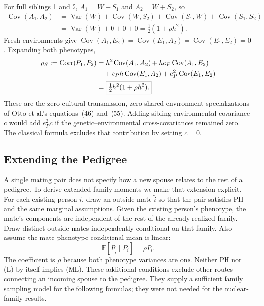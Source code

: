 For full siblings 1 and 2, $A_1=W+S_1$ and $A_2=W+S_2$, so
\begin{align*}
 \operatorname{Cov}(A_1,A_2)
 &=\operatorname{Var}(W)+\operatorname{Cov}(W,S_2)
   +\operatorname{Cov}(S_1,W)+\operatorname{Cov}(S_1,S_2)\\
 &=\operatorname{Var}(W)+0+0+0
   =\tfrac12(1+\rho h^2).
\end{align*}
Fresh environments give
$\operatorname{Cov}(A_1,E_2)=\operatorname{Cov}(E_1,A_2)
=\operatorname{Cov}(E_1,E_2)=0$. Expanding both phenotypes,
\begin{align}
 \rho_S:=\operatorname{Corr}(P_1,P_2)
 &=h^2\operatorname{Cov}(A_1,A_2)
   +h e_P\operatorname{Cov}(A_1,E_2)\notag\\
 &\quad+e_P h\operatorname{Cov}(E_1,A_2)
   +e_P^2\operatorname{Cov}(E_1,E_2)\notag\\
 &=\boxed{\tfrac12h^2(1+\rho h^2).}
 \label{eq:sib}
\end{align}
These are the zero-cultural-transmission, zero-shared-environment
specializations of Otto et al.'s equations~(46) and~(55).
Adding sibling environmental covariance $c$ would add $e_P^2c$ if the
genetic--environmental cross-covariances remained zero. The classical
formula excludes that contribution by setting $c=0$.

\subsection{Extending the Pedigree}
\label{sec:model-extended}

A single mating pair does not specify how a new spouse relates to the
rest of a pedigree. To derive extended-family moments we make that
extension explicit. For each existing person $i$, draw an outside mate
$\widetilde i$ so that the pair satisfies PH and the same marginal
assumptions. Given the existing person's phenotype, the mate's
components are independent of the rest of the already realized family.
Draw distinct outside mates independently conditional on that family.
Also assume the mate-phenotype conditional mean is linear:
\begin{equation}
 \mathbb E[P_{\widetilde i}\mid P_i]=\rho P_i.
 \tag{ML}\label{eq:model-mate-linearity}
\end{equation}
The coefficient is $\rho$ because both phenotype variances are one.
Neither PH nor (L) by itself implies (ML). These additional conditions
exclude other routes connecting an incoming spouse to the pedigree.
They supply a sufficient family sampling model for the following
formulas; they were not needed for the nuclear-family results.

